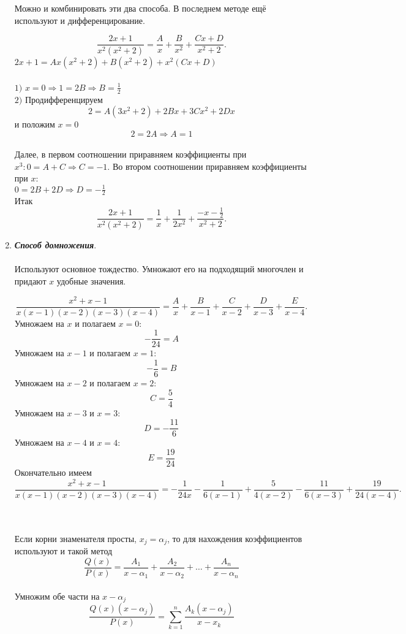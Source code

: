 \begin{enumerate}
	Можно и комбинировать эти два способа. В последнем методе ещё используют и дифференцирование.
	\begin{example} $$\frac{2x+1}{x^2(x^2+2)}=\frac{A}{x}+\frac{B}{x^2}+\frac{Cx+D}{x^2+2}.$$
		$2x+1=Ax(x^2+2)+B(x^2+2)+x^2(Cx+D)$\\\\
		$1)$ $x=0 \Rightarrow 1=2B\Rightarrow B=\frac{1}{2}$\\
		$2)$ Продифференцируем 
		$$2=A(3x^2+2)+2Bx+3Cx^2+2Dx$$
		и положим $x=0$\\
		$$2=2A\Rightarrow A=1$$\\
		Далее, в первом соотношении приравняем коэффициенты при $x^3:0=A+C\Rightarrow C=-1$. Во втором соотношении приравняем коэффициенты при $x:$\\
		$0=2B+2D\Rightarrow D=-\frac{1}{2}$\\
		Итак $$\frac{2x+1}{x^2(x^2+2)}=\frac{1}{x}+\frac{1}{2x^2}+\frac{-x-\frac{1}{2}}{x^2+2}.$$
	\end{example}
	\item \textit{\textbf{Способ домножения}}.\\\\
	Используют основное тождество. Умножают его на подходящий многочлен и придают $x$ удобные значения.\\
	\begin{example} $$\frac{x^2+x-1}{x(x-1)(x-2)(x-3)(x-4)}=\frac{A}{x}+\frac{B}{x-1}+\frac{C}{x-2}+\frac{D}{x-3}+\frac{E}{x-4}.$$
		Умножаем на $x$ и полагаем $x=0:$
		$$-\frac{1}{24}=A$$
		Умножаем на $x-1$ и полагаем $x=1:$
		$$-\frac{1}{6}=B$$
		Умножаем на $x-2$ и полагаем $x=2:$
		$$C=\frac{5}{4}$$
		Умножаем на $x-3$ и $x=3:$
		$$D=-\frac{11}{6}$$
		Умножаем на $x-4$ и $x=4:$\\
		$$E=\frac{19}{24}$$
		Окончательно имеем
		$$\frac{x^2+x-1}{x(x-1)(x-2)(x-3)(x-4)}=-\frac{1}{24x}-\frac{1}{6(x-1)}+\frac{5}{4(x-2)}-\frac{11}{6(x-3)}+\frac{19}{24(x-4)}.$$
	\end{example}\\\\
	Если корни знаменателя просты, $x_j=\alpha_j$, то для нахождения коэффициентов используют и такой метод\\
	$$\frac{Q(x)}{P(x)}=\frac{A_1}{x-\alpha_1}+\frac{A_2}{x-\alpha_2}+\dots+\frac{A_n}{x-\alpha_n}$$\\
	Умножим обе части на $x-\alpha_j$\\
	$$\frac{Q(x)(x-\alpha_j)}{P(x)}=\sum\limits_{k=1}^n\frac{A_k(x-\alpha_j)}{x-x_k}$$\\

\end{enumerate}
